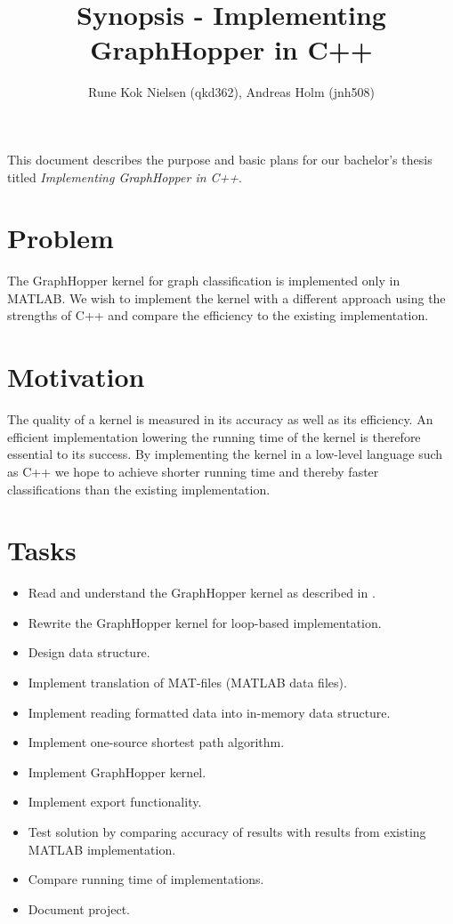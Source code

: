 \documentclass{article}
\author{Rune Kok Nielsen (qkd362), Andreas Holm (jnh508)}
\title{Synopsis - Implementing GraphHopper in C++}
\begin{document}
	
\maketitle

This document describes the purpose and basic plans for our bachelor's thesis titled \textit{Implementing GraphHopper in C++}.

\section{Problem}
The GraphHopper kernel for graph classification is implemented only in MATLAB. We wish to implement the kernel with a different approach using the strengths of C++ and compare the efficiency to the existing implementation.


\section{Motivation}
The quality of a kernel is measured in its accuracy as well as its efficiency. An efficient implementation lowering the running time of the kernel is therefore essential to its success. By implementing the kernel in a low-level language such as C++ we hope to achieve shorter running time and thereby faster classifications than the existing implementation.

\section{Tasks}
\begin{itemize}
	\item Read and understand the GraphHopper kernel as described in \cite{graphhopper}.
	\item Rewrite the GraphHopper kernel for loop-based implementation.
	\item Design data structure.
	\item Implement translation of MAT-files (MATLAB data files).
	\item Implement reading formatted data into in-memory data structure.
	\item Implement one-source shortest path algorithm.
	\item Implement GraphHopper kernel.
	\item Implement export functionality.
	\item Test solution by comparing accuracy of results with results from existing MATLAB implementation.
	\item Compare running time of implementations.
	\item Document project.
\end{itemize}
\end{document}
